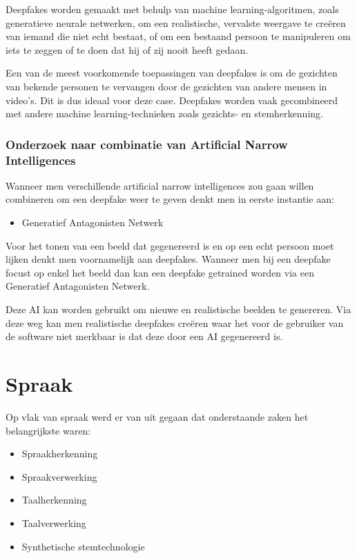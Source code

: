 Deepfakes worden gemaakt met behulp van machine learning-algoritmen, zoals generatieve neurale netwerken, om een ​​realistische, vervalste weergave te creëren van iemand die niet echt bestaat, of om een bestaand persoon te manipuleren om iets te zeggen of te doen dat hij of zij nooit heeft gedaan.

Een van de meest voorkomende toepassingen van deepfakes is om de gezichten van bekende personen te vervangen door de gezichten van andere mensen in video's. Dit is dus ideaal voor deze case. Deepfakes worden vaak gecombineerd met andere machine learning-technieken zoals gezichts- en stemherkenning.

\subsubsection{Onderzoek naar combinatie van Artificial Narrow Intelligences}

Wanneer men verschillende artificial narrow intelligences zou gaan willen combineren om een deepfake weer te geven denkt men in eerste instantie aan:

\begin{itemize}
    \item Generatief Antagonisten Netwerk
\end{itemize}

Voor het tonen van een beeld dat gegenereerd is en op een echt persoon moet lijken denkt men voornamelijk aan deepfakes. Wanneer men bij een deepfake focust op enkel het beeld dan kan een deepfake getrained worden via een Generatief Antagonisten Netwerk.

Deze AI kan worden gebruikt om nieuwe en realistische beelden te genereren. Via deze weg kan men realistische deepfakes creëren waar het voor de gebruiker van de software niet merkbaar is dat deze door een AI gegenereerd is.

\section{Spraak}

Op vlak van spraak werd er van uit gegaan dat onderstaande zaken het belangrijkste waren:

\begin{itemize}
    \item Spraakherkenning
    \item Spraakverwerking
    \item Taalherkenning
    \item Taalverwerking
    \item Synthetische stemtechnologie
\end{itemize}

